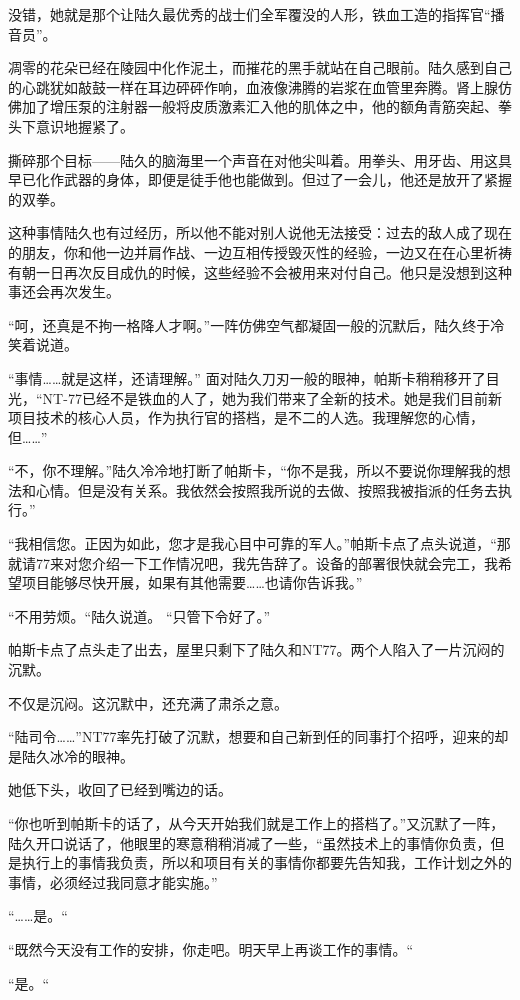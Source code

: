 没错，她就是那个让陆久最优秀的战士们全军覆没的人形，铁血工造的指挥官“播音员”。

凋零的花朵已经在陵园中化作泥土，而摧花的黑手就站在自己眼前。陆久感到自己的心跳犹如敲鼓一样在耳边砰砰作响，血液像沸腾的岩浆在血管里奔腾。肾上腺仿佛加了增压泵的注射器一般将皮质激素汇入他的肌体之中，他的额角青筋突起、拳头下意识地握紧了。

撕碎那个目标——陆久的脑海里一个声音在对他尖叫着。用拳头、用牙齿、用这具早已化作武器的身体，即便是徒手他也能做到。但过了一会儿，他还是放开了紧握的双拳。

这种事情陆久也有过经历，所以他不能对别人说他无法接受：过去的敌人成了现在的朋友，你和他一边并肩作战、一边互相传授毁灭性的经验，一边又在在心里祈祷有朝一日再次反目成仇的时候，这些经验不会被用来对付自己。他只是没想到这种事还会再次发生。

“呵，还真是不拘一格降人才啊。”一阵仿佛空气都凝固一般的沉默后，陆久终于冷笑着说道。

“事情……就是这样，还请理解。” 面对陆久刀刃一般的眼神，帕斯卡稍稍移开了目光，“NT-77已经不是铁血的人了，她为我们带来了全新的技术。她是我们目前新项目技术的核心人员，作为执行官的搭档，是不二的人选。我理解您的心情，但……”

“不，你不理解。”陆久冷冷地打断了帕斯卡，“你不是我，所以不要说你理解我的想法和心情。但是没有关系。我依然会按照我所说的去做、按照我被指派的任务去执行。”

“我相信您。正因为如此，您才是我心目中可靠的军人。”帕斯卡点了点头说道，“那就请77来对您介绍一下工作情况吧，我先告辞了。设备的部署很快就会完工，我希望项目能够尽快开展，如果有其他需要……也请你告诉我。”

“不用劳烦。“陆久说道。 “只管下令好了。”

帕斯卡点了点头走了出去，屋里只剩下了陆久和NT77。两个人陷入了一片沉闷的沉默。

不仅是沉闷。这沉默中，还充满了肃杀之意。

“陆司令……”NT77率先打破了沉默，想要和自己新到任的同事打个招呼，迎来的却是陆久冰冷的眼神。

她低下头，收回了已经到嘴边的话。

“你也听到帕斯卡的话了，从今天开始我们就是工作上的搭档了。”又沉默了一阵，陆久开口说话了，他眼里的寒意稍稍消减了一些，“虽然技术上的事情你负责，但是执行上的事情我负责，所以和项目有关的事情你都要先告知我，工作计划之外的事情，必须经过我同意才能实施。”

“……是。“

“既然今天没有工作的安排，你走吧。明天早上再谈工作的事情。“

“是。“

